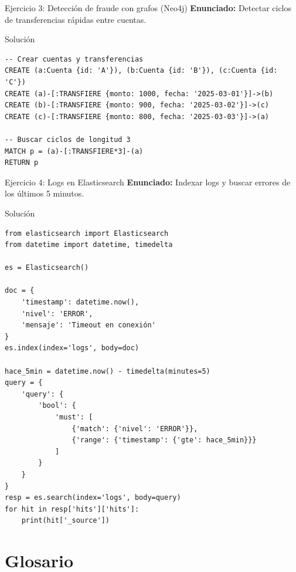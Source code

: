\documentclass[aspectratio=169, 10pt, xcolor=table]{beamer}
\begin{document}
\begin{frame}[fragile]{Ejercicio 3: Detección de fraude con grafos (Neo4j)}
    \textbf{Enunciado:} Detectar ciclos de transferencias rápidas entre cuentas.
    \begin{block}{Solución}
        \begin{lstlisting}
-- Crear cuentas y transferencias
CREATE (a:Cuenta {id: 'A'}), (b:Cuenta {id: 'B'}), (c:Cuenta {id: 'C'})
CREATE (a)-[:TRANSFIERE {monto: 1000, fecha: '2025-03-01'}]->(b)
CREATE (b)-[:TRANSFIERE {monto: 900, fecha: '2025-03-02'}]->(c)
CREATE (c)-[:TRANSFIERE {monto: 800, fecha: '2025-03-03'}]->(a)

-- Buscar ciclos de longitud 3
MATCH p = (a)-[:TRANSFIERE*3]-(a)
RETURN p
        \end{lstlisting}
    \end{block}
\end{frame}

\begin{frame}[fragile]{Ejercicio 4: Logs en Elasticsearch}
    \textbf{Enunciado:} Indexar logs y buscar errores de los últimos 5 minutos.
    \begin{block}{Solución}
        \begin{lstlisting}[style=python]
from elasticsearch import Elasticsearch
from datetime import datetime, timedelta

es = Elasticsearch()

doc = {
    'timestamp': datetime.now(),
    'nivel': 'ERROR',
    'mensaje': 'Timeout en conexión'
}
es.index(index='logs', body=doc)

hace_5min = datetime.now() - timedelta(minutes=5)
query = {
    'query': {
        'bool': {
            'must': [
                {'match': {'nivel': 'ERROR'}},
                {'range': {'timestamp': {'gte': hace_5min}}}
            ]
        }
    }
}
resp = es.search(index='logs', body=query)
for hit in resp['hits']['hits']:
    print(hit['_source'])
        \end{lstlisting}
    \end{block}
\end{frame}

\section{Glosario}
\end{document}
